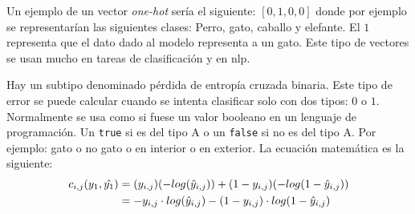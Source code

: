 \begin{itemize}
Un ejemplo de un vector \textit{one-hot} sería el siguiente: $[0,1,0,0]$ donde por ejemplo se representarían las siguientes clases: Perro, gato, caballo y elefante. El $1$ representa que el dato dado al modelo representa a un gato. Este tipo de vectores se usan mucho en tareas de clasificación y en \acrfull{nlp}.
\newline

Hay un subtipo denominado pérdida de entropía cruzada binaria. Este tipo de error se puede calcular cuando se intenta clasificar solo con dos tipos: $0$ o $1$. Normalmente se usa como si fuese un valor booleano en un lenguaje de programación. Un \verb|true| si es del tipo A o un \verb|false| si no es del tipo A. Por ejemplo: gato o no gato o en interior o en exterior. La ecuación matemática es la siguiente:
\begin{equation}
\centering
    \begin{split}
        c_{i,j}(y_1, \hat{y_1}) &= (y_{i,j})(-log(\hat{y}_{i,j})) + (1-y_{i,j}) (-log(1 - \hat{y}_{i,j})) \\
        &= -y_{i,j} \cdot log(\hat{y}_{i,j}) - (1 - y_{i,j}) \cdot log(1 - \hat{y}_{i,j})
    \end{split}
\end{equation}


\end{itemize}

